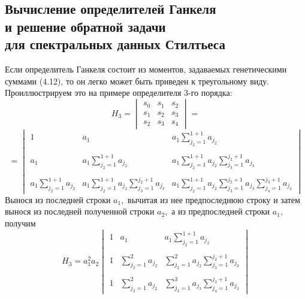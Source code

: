 \documentclass[12pt,a4paper]{article}
\theoremstyle{plain}   \newtheorem{Pro}{Задача}
\begin{document}
\subsection{Вычисление определителей Ганкеля \\
и решение обратной
задачи \\
для спектральных данных Стилтьеса}
Если определитель Ганкеля состоит из моментов,
задаваемых генетическими суммами (4.12),
то он легко может быть приведен к треугольному виду.
Проиллюстрируем это на примере определителя 3-го порядка:
\begin{equation*}
  H_3 =
    \begin{vmatrix}
	  s_0 & s_1 & s_2 \\
	  s_1 & s_2 & s_3 \\
	  s_2 & s_3 & s_4
	\end{vmatrix}
	=
\end{equation*}
\begin{equation*}
  =
  \begin{vmatrix}
    1 & a_1 & a_1 \sum _{j_2 =1}^{1+1}a_{j_2} \\
	\; & \; & \; \\
	a_1 & a_1 \sum _{j_2 =1}^{1+1}a_{j_2} &
	  a_1 \sum _{j_2 =1}^{1+1}a_{j_2}
	    \sum _{j_3 =1}^{j_2 +1}a_{j_3} \\
		\; & \; & \; \\
	a_1 \sum _{j_2 =1}^{1+1}a_{j_2} &
	   a_1 \sum _{j_2 =1}^{1+1}a_{j_2}
	     \sum _{j_3 =1}^{j_2 +1}a_{j_3} &
		   a_1 \sum _{j_2 =1}^{1+1}a_{j_2}
		     \sum _{j_3 =1}^{j_2 +1}a_{j_3}
			   \sum _{j_4 =1}^{j_3 +1}a_{j_4}
   \end{vmatrix}
\end{equation*}
Вынося из последней строки
$ a_1 , $
вычитая из нее предпоследнюю строку и затем вынося
из последней полученной строки
$ a_2 , $
а из предпоследней строки
$ a_1 , $
получим
\begin{equation*}
  H_3 =a_1 ^2 a_2
    \begin{vmatrix}
	  1 & a_1 & a_1 \sum _{j_2 =1}^{1+1}a_{j_2} \\
	  \; & \; & \; \\
	  1 & \sum _{j_2 =1}^2 a_{j_2} &
	    \sum _{j_2 =1}^2 a_{j_2}
		  \sum _{j_3 =1}^{j_2 +1}a_{j_3} \\
		  \; & \; & \; \\
	  1 & \sum _{j_2 =1}^2 a_{j_2} &
	    \sum _{j_3 =1}^3 a_{j_3}
		  \sum _{j_4 =1}^{j_3+1}a_{j_3}
	\end{vmatrix}
\end{equation*}
\end{document}
